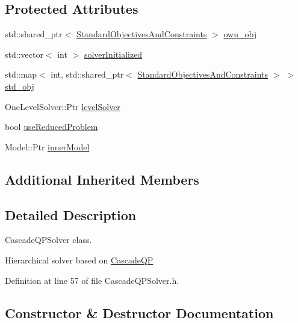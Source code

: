\subsection*{Protected Attributes}
\begin{DoxyCompactItemize}
\item 
std\+::shared\+\_\+ptr$<$ \hyperlink{structocra_1_1CascadeQPSolver_1_1StandardObjectivesAndConstraints}{Standard\+Objectives\+And\+Constraints} $>$ \hyperlink{classocra_1_1CascadeQPSolver_aec6bf15caf1f29d7e1ec5aab696b1e7b}{own\+\_\+obj}
\item 
std\+::vector$<$ int $>$ \hyperlink{classocra_1_1CascadeQPSolver_a9d45b623d0012aae018b8eb8d4a66646}{solver\+Initialized}
\item 
std\+::map$<$ int, std\+::shared\+\_\+ptr$<$ \hyperlink{structocra_1_1CascadeQPSolver_1_1StandardObjectivesAndConstraints}{Standard\+Objectives\+And\+Constraints} $>$ $>$ \hyperlink{classocra_1_1CascadeQPSolver_aafe2d2d5226c421fc53880570a25a665}{std\+\_\+obj}
\item 
One\+Level\+Solver\+::\+Ptr \hyperlink{classocra_1_1CascadeQPSolver_a119ac44ca89426cddf6484577962726d}{level\+Solver}
\item 
bool \hyperlink{classocra_1_1CascadeQPSolver_a8703a516e8ce6adb088867d8b39dfa4d}{use\+Reduced\+Problem}
\item 
Model\+::\+Ptr \hyperlink{classocra_1_1CascadeQPSolver_a3a7c69b86a236e8b0ffc678be798109f}{inner\+Model}
\end{DoxyCompactItemize}
\subsection*{Additional Inherited Members}


\subsection{Detailed Description}
Cascade\+Q\+P\+Solver class. 

Hierarchical solver based on \hyperlink{classocra_1_1CascadeQP}{Cascade\+QP} 

Definition at line 57 of file Cascade\+Q\+P\+Solver.\+h.



\subsection{Constructor \& Destructor Documentation}
